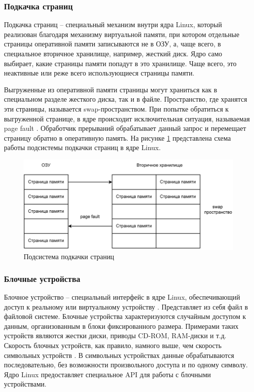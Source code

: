\subsubsection{Подкачка страниц}

Подкачка страниц -- специальный механизм внутри ядра Linux, который реализован благодаря механизму виртуальной памяти, при котором отдельные страницы оперативной памяти записываются не в ОЗУ, а, чаще всего, в специальное вторичное хранилище, например, жесткий диск. Ядро само выбирает, какие страницы памяти попадут в это хранилище. Чаще всего, это неактивные или реже всего использующиеся страницы памяти. 

Выгруженные из оперативной памяти страницы могут храниться как в специальном разделе жесткого диска, так и в файле. Пространство, где хранятся эти страницы, называется swap-пространством. При попытке обратиться к выгруженной странице, в ядре происходит исключительная ситуация, называемая page fault \cite{page-fault}. Обработчик прерываний обрабатывает данный запрос и перемещает страницу обратно в оперативную память. На рисунке \ref{fig:swap} представлена схема работы подсистемы подкачки страниц в ядре Linux.

\begin{figure}[h]
	\centering
	\includegraphics[width=\textwidth]{img/swap.pdf}
	\caption{Подсистема подкачки страниц}
	\label{fig:swap}
\end{figure}

\subsubsection{Блочные устройства}

Блочное устройство -- специальный интерфейс в ядре Linux, обеспечивающий доступ к реальному или виртуальному устройству \cite{block-devices}. Представляет из себя файл в файловой системе. Блочные устройства характеризуются случайным доступом к данным, организованным в блоки фиксированного размера. Примерами таких устройств являются жестки диски, приводы CD-ROM, RAM-диски и т.д. Скорость блочных устройств, как правило, намного выше, чем скорость символьных устройств \cite{character-devices}. В символьных устройствах данные обрабатываются последовательно, без возможности произвольного доступа и по одному символу. Ядро Linux предоставляет специальное API для работы с блочными устройствами.

